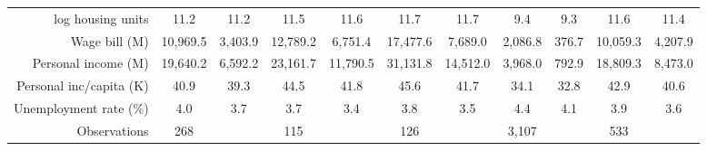 \begin{tabular}{r*{5}{c}*{5}{c}}
log housing units   &        11.2&        11.2&        11.5&        11.6&        11.7&        11.7&         9.4&         9.3&        11.6&        11.4\\
Wage bill (M)       &    10,969.5&     3,403.9&    12,789.2&     6,751.4&    17,477.6&     7,689.0&     2,086.8&       376.7&    10,059.3&     4,207.9\\
Personal income (M) &    19,640.2&     6,592.2&    23,161.7&    11,790.5&    31,131.8&    14,512.0&     3,968.0&       792.9&    18,809.3&     8,473.0\\
Personal inc/capita (K)&        40.9&        39.3&        44.5&        41.8&        45.6&        41.7&        34.1&        32.8&        42.9&        40.6\\
Unemployment rate (\%)&         4.0&         3.7&         3.7&         3.4&         3.8&         3.5&         4.4&         4.1&         3.9&         3.6\\
\midrule
Observations        &         268&            &         115&            &         126&            &       3,107&            &         533&            \\
\bottomrule \end{tabular}
